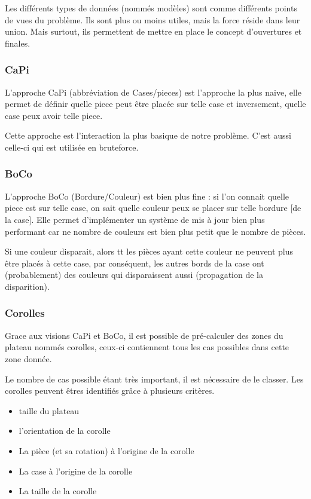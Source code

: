 \documentclass{article}
\begin{document}
	Les différents types de données (nommés modèles) sont comme différents points de vues du problème. Ils sont plus ou moins utiles, mais la force réside dans leur union. Mais surtout, ils permettent de mettre en place le concept d'ouvertures et finales.

	\subsubsection{CaPi}

	L'approche CaPi (abbréviation de Cases/pieces) est l'approche la plus naive, elle permet de définir quelle piece peut être placée sur telle case et inversement, quelle case peux avoir telle piece.

	Cette approche est l'interaction la plus basique de notre problème. C'est aussi celle-ci qui est utilisée en bruteforce.

	\subsubsection{BoCo}

	L'approche BoCo (Bordure/Couleur) est bien plus fine : si l'on connait quelle piece est sur telle case, on sait quelle couleur peux se placer sur telle bordure [de la case]. Elle permet d'implémenter un système de mis à jour bien plus performant car ne nombre de couleurs est bien plus petit que le nombre de pièces.

	\begin{exmp}
		Si une couleur disparait, alors tt les pièces ayant cette couleur ne peuvent plus être placés à cette case, par conséquent, les autres bords de la case ont (probablement) des couleurs qui disparaissent aussi (propagation de la disparition).
	\end{exmp}

	\subsubsection{Corolles}

	Grace aux visions CaPi et BoCo, il est possible de pré-calculer des zones du plateau nommés corolles, ceux-ci contiennent tous les cas possibles dans cette zone donnée.

	Le nombre de cas possible étant très important, il est nécessaire de le classer. Les corolles peuvent êtres identifiés grâce à plusieurs critères.

	\begin{itemize}
		\item taille du plateau
		\item l'orientation de la corolle
		\item La pièce (et sa rotation) à l'origine de la corolle
		\item La case à l'origine de la corolle
		\item La taille de la corolle
	\end{itemize}
\end{document}
